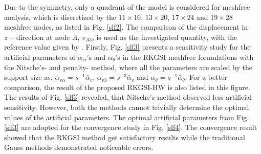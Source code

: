 Due to the symmetry, only a quadrant of the model is considered for meshfree analysis, which is discretized by the $11\times 16$, $13\times 20$, $17\times 24$ and $19\times28$ meshfree nodes, as listed in Fig. \ref{slf2}. The comparison of the displacement in $z-$direction at node $A$, $v_{A3}$, is used as the investigated quantity, with the reference value \DIFdelbegin {}\DIFdelend \DIFaddbegin {}\DIFaddend given by \cite{kiendl2009}. Firstly, Fig. \ref{slf3} presents a sensitivity study for the artificial parameters of $\alpha_{vi}$'s and $\alpha_\theta$'s in the RKGSI meshfree formulations with the Nitsche's- and penalty- method, where all \DIFdelbegin {}\DIFdelend the parameters are scaled by the support size as, $\alpha_{v\alpha} = s^{-1}\bar \alpha_v$, $\alpha_{v3} = s^{-3} \bar \alpha_v$ and $\alpha_\theta = s^{-1}\bar \alpha_\theta$. For a better comparison, the result of the proposed RKGSI-HW is also listed in this figure. The results of Fig. \ref{slf3} revealed, that Nitsche's method observed less artificial sensitivity. However, both the methods cannot trivially determine the optimal values of the artificial parameters. The optimal artificial parameters from Fig. \ref{slf3} are adopted for the convergence study in Fig. \ref{slf4}. The convergence result showed that the RKGSI method get satisfactory results while the traditional Gauss methods demonstrated noticeable errors.

